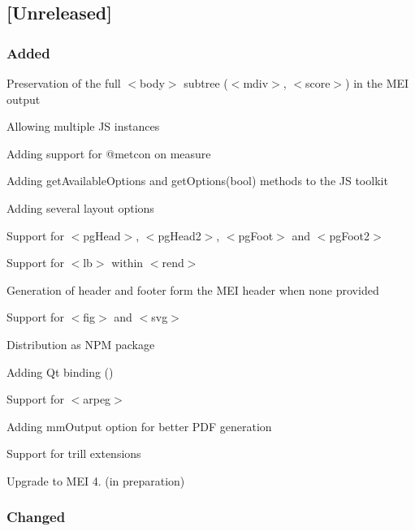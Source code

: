 \subsection*{\mbox{[}Unreleased\mbox{]}}

\subsubsection*{Added}


\begin{DoxyItemize}
\item Preservation of the full {\ttfamily $<$body$>$} subtree ({\ttfamily $<$mdiv$>$}, {\ttfamily $<$score$>$}) in the M\+EI output
\item Allowing multiple JS instances
\item Adding support for {\ttfamily @metcon} on measure
\item Adding get\+Available\+Options and get\+Options(bool) methods to the JS toolkit
\item Adding several layout options
\item Support for {\ttfamily $<$pg\+Head$>$}, {\ttfamily $<$pg\+Head2$>$}, {\ttfamily $<$pg\+Foot$>$} and {\ttfamily $<$pg\+Foot2$>$}
\item Support for {\ttfamily $<$lb$>$} within {\ttfamily $<$rend$>$}
\item Generation of header and footer form the M\+EI header when none provided
\item Support for {\ttfamily $<$fig$>$} and {\ttfamily $<$svg$>$}
\item Distribution as N\+PM package
\item Adding Qt binding ()
\item Support for {\ttfamily $<$arpeg$>$}
\item Adding mm\+Output option for better P\+DF generation
\item Support for trill extensions
\item Upgrade to M\+EI 4. (in preparation)
\end{DoxyItemize}

\subsubsection*{Changed}


